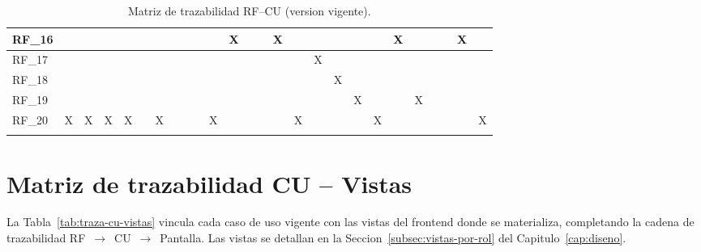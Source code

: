 \begin{landscape}
\begin{longtable}{|l|*{25}{c|}}
RF\_16 &  &  &  &  &  &  &  &  &  &  & X &  &  & X &  &  &  &  &  & X &  &  &  & X &  \\\hline
RF\_17 &  &  &  &  &  &  &  &  &  &  &  &  &  &  &  & X &  &  &  &  &  &  &  &  &  \\\hline
RF\_18 &  &  &  &  &  &  &  &  &  &  &  &  &  &  &  &  & X &  &  &  &  &  &  &  &  \\\hline
RF\_19 &  &  &  &  &  &  &  &  &  &  &  &  &  &  &  &  &  & X &  &  & X &  &  &  &  \\\hline
RF\_20 & X & X & X & X &  & X &  &  &  & X &  &  &  &  & X &  &  &  & X &  &  &  &  &  & X \\\hline
\caption{Matriz de trazabilidad RF--CU (version vigente).}
\label{tab:traza-grid}
\end{longtable}
\end{landscape}

\section{Matriz de trazabilidad CU -- Vistas}

La Tabla~\ref{tab:traza-cu-vistas} vincula cada caso de uso vigente con las vistas del frontend donde se materializa, completando la cadena de trazabilidad RF~$\rightarrow$~CU~$\rightarrow$~Pantalla. Las vistas se detallan en la Seccion~\ref{subsec:vistas-por-rol} del Capitulo~\ref{cap:diseno}.

